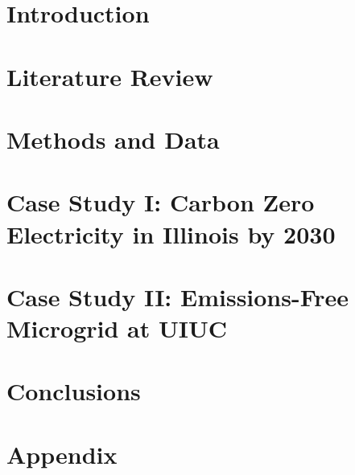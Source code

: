 \documentclass[edeposit,fullpage,11pt]{uiucthesis2018}
\begin{document}
%
%
\tableofcontents
\listoftables
\listoffigures
%

%
\pagebreak
\mainmatter
%

\glsresetall
\chapter{Introduction}

%
\chapter{Literature Review}

\label{chapter:litrev}

\chapter{Methods and Data}
\label{chapter:methods}


\chapter{Case Study I: Carbon Zero Electricity in Illinois by 2030}
\label{chapter:illinois}


 \chapter{Case Study II: Emissions-Free Microgrid at UIUC}
\label{chapter:uiuc}
 

\chapter{Conclusions}


\backmatter



%
\appendix
{}
\chapter*{Appendix}

%
\end{document}
